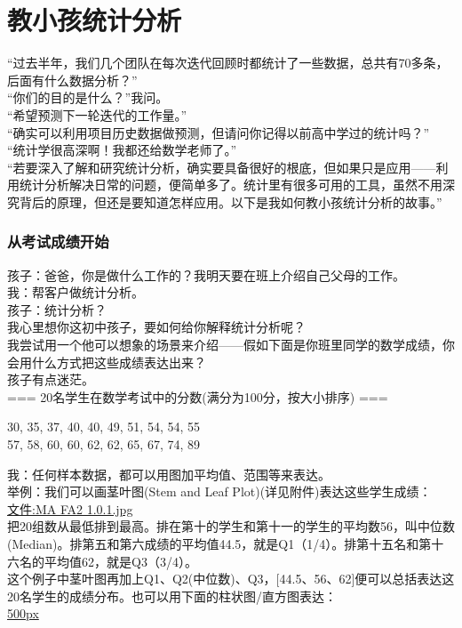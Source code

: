 \chapter{教小孩统计分析} %

``过去半年，我们几个团队在每次迭代回顾时都统计了一些数据，总共有70多条，后面有什么数据分析？''\\
``你们的目的是什么？''我问。\\
``希望预测下一轮迭代的工作量。''\\
``确实可以利用项目历史数据做预测，但请问你记得以前高中学过的统计吗？''\\
``统计学很高深啊！我都还给数学老师了。''\\
``若要深入了解和研究统计分析，确实要具备很好的根底，但如果只是应用------利用统计分析解决日常的问题，便简单多了。统计里有很多可用的工具，虽然不用深究背后的原理，但还是要知道怎样应用。以下是我如何教小孩统计分析的故事。''\\

\hypertarget{ux4eceux8003ux8bd5ux6210ux7ee9ux5f00ux59cb}{%
\subsection{从考试成绩开始}\label{ux4eceux8003ux8bd5ux6210ux7ee9ux5f00ux59cb}}

孩子：爸爸，你是做什么工作的？我明天要在班上介绍自己父母的工作。\\
我：帮客户做统计分析。\\
孩子：统计分析？\\
我心里想你这初中孩子，要如何给你解释统计分析呢？\\
我尝试用一个他可以想象的场景来介绍------假如下面是你班里同学的数学成绩，你会用什么方式把这些成绩表达出来？\\
孩子有点迷茫。\\
=== 20名学生在数学考试中的分数(满分为100分，按大小排序) ===

30, 35, 37, 40, 40, 49, 51, 54, 54, 55\\
57, 58, 60, 60, 62, 62, 65, 67, 74, 89

我：任何样本数据，都可以用图加平均值、范围等来表达。\\
举例：我们可以画茎叶图(Stem and Leaf Plot)(详见附件)表达这些学生成绩：\\
\href{文件:MA_FA2_1.0.1.jpg}{文件:MA FA2 1.0.1.jpg}\\
把20组数从最低排到最高。排在第十的学生和第十一的学生的平均数56，叫中位数(Median)。排第五和第六成绩的平均值44.5，就是Q1（1/4）。排第十五名和第十六名的平均值62，就是Q3（3/4）。\\
这个例子中茎叶图再加上Q1、Q2(中位数)、Q3，{[}44.5、56、62{]}便可以总括表达这20名学生的成绩分布。也可以用下面的柱状图/直方图表达：\\
\href{文件:MA_FA1_1-1.jpg}{500px}

